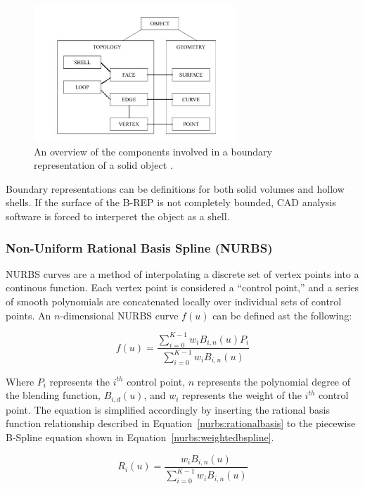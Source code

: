 \documentclass[12pt]{drexelthesis}
\let\Oldsubsubsection\subsubsection
\renewcommand{\subsubsection}{\FloatBarrier\Oldsubsubsection}
\begin{document}
\begin{figure}[!ht]
	\centering
		\includegraphics[width=3in]{cadTypes/brep.jpg}
	\caption[Components of a boundary representation.]{\centering An overview of the components involved in a boundary representation of a solid object \cite{Stroud2006}.}
\end{figure}

Boundary representations can be definitions for both solid volumes and hollow shells. If the surface of the B-REP is not completely bounded, CAD analysis software is forced to interperet the object as a shell.

\subsubsection{Non-Uniform Rational Basis Spline (NURBS)}
NURBS curves are a method of interpolating a discrete set of vertex points into a continous function. Each vertex point is considered a ``control point,'' and a series of smooth polynomials are concatenated locally over individual sets of control points. An $n$-dimensional NURBS curve $f(u)$ can be defined ast the following:

\begin{equation}
	f(u) = \frac    {   \sum_{i=0}^{K-1} w_{i} B_{i,n}(u) P_{i} }
				 	{  \sum_{i=0}^{K-1} w_{i} B_{i,n}(u) }
	\label{nurbs:weightedbspline}
 \end{equation}
 
 Where $P_{i}$ represents the $i^{th}$ control point, $n$ represents the polynomial degree of the blending function, $B_{i,d}(u)$, and $w_{i}$ represents the weight of the $i^{th}$ control point. The equation is simplified accordingly by inserting the rational basis function relationship described in Equation~\ref{nurbs:rationalbasis} to the piecewise B-Spline equation shown in Equation~\ref{nurbs:weightedbspline}.
 
\begin{equation}
	R_{i}(u) = \frac    {   w_{i} B_{i,n}(u)}
				 		{  \sum_{i=0}^{K-1} w_{i} B_{i,n}(u) }
	\label{nurbs:rationalbasis}
 \end{equation}
 
\end{document}
